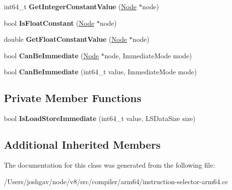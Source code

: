 \begin{DoxyCompactItemize}
\item 
int64\+\_\+t {\bfseries Get\+Integer\+Constant\+Value} (\hyperlink{classv8_1_1internal_1_1compiler_1_1_node}{Node} $\ast$node)\hypertarget{classv8_1_1internal_1_1compiler_1_1_arm64_operand_generator_a7d722c9454c869b4805290eda03eb0ec}{}\label{classv8_1_1internal_1_1compiler_1_1_arm64_operand_generator_a7d722c9454c869b4805290eda03eb0ec}

\item 
bool {\bfseries Is\+Float\+Constant} (\hyperlink{classv8_1_1internal_1_1compiler_1_1_node}{Node} $\ast$node)\hypertarget{classv8_1_1internal_1_1compiler_1_1_arm64_operand_generator_a71914a8203678e368f20876843d4bc1d}{}\label{classv8_1_1internal_1_1compiler_1_1_arm64_operand_generator_a71914a8203678e368f20876843d4bc1d}

\item 
double {\bfseries Get\+Float\+Constant\+Value} (\hyperlink{classv8_1_1internal_1_1compiler_1_1_node}{Node} $\ast$node)\hypertarget{classv8_1_1internal_1_1compiler_1_1_arm64_operand_generator_ae570be798733a54bcee9f559b3f7debc}{}\label{classv8_1_1internal_1_1compiler_1_1_arm64_operand_generator_ae570be798733a54bcee9f559b3f7debc}

\item 
bool {\bfseries Can\+Be\+Immediate} (\hyperlink{classv8_1_1internal_1_1compiler_1_1_node}{Node} $\ast$node, Immediate\+Mode mode)\hypertarget{classv8_1_1internal_1_1compiler_1_1_arm64_operand_generator_ac369443cd34e7d1c0fc3f0649824284e}{}\label{classv8_1_1internal_1_1compiler_1_1_arm64_operand_generator_ac369443cd34e7d1c0fc3f0649824284e}

\item 
bool {\bfseries Can\+Be\+Immediate} (int64\+\_\+t value, Immediate\+Mode mode)\hypertarget{classv8_1_1internal_1_1compiler_1_1_arm64_operand_generator_a2f5538f12c78b7d3805620d55639021b}{}\label{classv8_1_1internal_1_1compiler_1_1_arm64_operand_generator_a2f5538f12c78b7d3805620d55639021b}

\end{DoxyCompactItemize}
\subsection*{Private Member Functions}
\begin{DoxyCompactItemize}
\item 
bool {\bfseries Is\+Load\+Store\+Immediate} (int64\+\_\+t value, L\+S\+Data\+Size size)\hypertarget{classv8_1_1internal_1_1compiler_1_1_arm64_operand_generator_a2502c762c360eed10a51b2d09a4bd919}{}\label{classv8_1_1internal_1_1compiler_1_1_arm64_operand_generator_a2502c762c360eed10a51b2d09a4bd919}

\end{DoxyCompactItemize}
\subsection*{Additional Inherited Members}


The documentation for this class was generated from the following file\+:\begin{DoxyCompactItemize}
\item 
/\+Users/joshgav/node/v8/src/compiler/arm64/instruction-\/selector-\/arm64.\+cc\end{DoxyCompactItemize}

